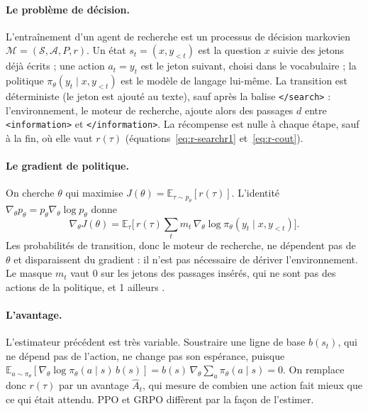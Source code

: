 \paragraph{Le problème de décision.} L'entraînement d'un agent de recherche est un processus de décision markovien $\mathcal{M} = (\mathcal{S}, \mathcal{A}, P, r)$. Un état $s_t = (x, y_{<t})$ est la question $x$ suivie des jetons déjà écrits ; une action $a_t = y_t$ est le jeton suivant, choisi dans le vocabulaire ; la politique $\pi_\theta(y_t \mid x, y_{<t})$ est le modèle de langage lui-même. La transition est déterministe (le jeton est ajouté au texte), sauf après la balise \texttt{</search>} : l'environnement, le moteur de recherche, ajoute alors des passages $d$ entre \texttt{<information>} et \texttt{</information>}. La récompense est nulle à chaque étape, sauf à la fin, où elle vaut $r(\tau)$ (équations~\ref{eq:r-searchr1} et~\ref{eq:r-cout}).

\paragraph{Le gradient de politique.} On cherche $\theta$ qui maximise $J(\theta) = \mathbb{E}_{\tau \sim p_\theta}[r(\tau)]$. L'identité $\nabla_\theta p_\theta = p_\theta \nabla_\theta \log p_\theta$ donne
\begin{equation}
\nabla_\theta J(\theta) = \mathbb{E}_{\tau}\Big[\, r(\tau) \sum_t m_t \, \nabla_\theta \log \pi_\theta(y_t \mid x, y_{<t}) \Big].
\end{equation}
Les probabilités de transition, donc le moteur de recherche, ne dépendent pas de $\theta$ et disparaissent du gradient : il n'est pas nécessaire de dériver l'environnement. Le masque $m_t$ vaut 0 sur les jetons des passages insérés, qui ne sont pas des actions de la politique, et 1 ailleurs \citep{jin2025search}.

\paragraph{L'avantage.} L'estimateur précédent est très variable. Soustraire une ligne de base $b(s_t)$, qui ne dépend pas de l'action, ne change pas son espérance, puisque $\mathbb{E}_{a \sim \pi_\theta}[\nabla_\theta \log \pi_\theta(a \mid s)\, b(s)] = b(s)\, \nabla_\theta \sum_a \pi_\theta(a \mid s) = 0$. On remplace donc $r(\tau)$ par un avantage $\hat{A}_t$, qui mesure de combien une action fait mieux que ce qui était attendu. PPO et GRPO diffèrent par la façon de l'estimer.

